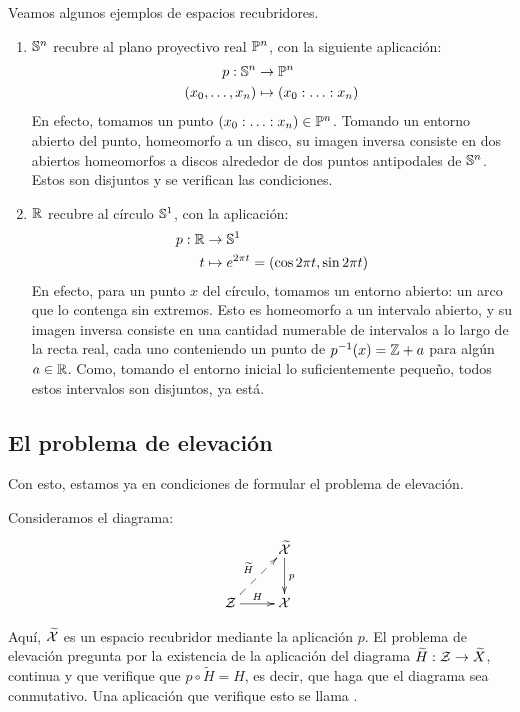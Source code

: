 \begin{exa}[Recubrimientos]
	\label{grf_exa_recubrimientos}
	Veamos algunos ejemplos de espacios recubridores.
	
	\begin{enumerate}
		\item $\mathbb{S}^n$ recubre al plano proyectivo real $\mathbb{P}^n$, con la siguiente aplicación:
		\[\begin{split}
		p:\mathbb{S}^n&\to\mathbb{P}^n \\
		(x_0,\dots,x_n)&\mapsto (x_0:\dotsc:x_n)
		\end{split}\]
		En efecto, tomamos un punto $(x_0:\dotsc:x_n)\in\mathbb{P}^n$. Tomando un entorno abierto del punto, homeomorfo a un disco, su imagen inversa consiste en dos abiertos homeomorfos a discos alrededor de dos puntos antipodales de $\mathbb{S}^n$. Estos son disjuntos y se verifican las condiciones.
		
		\item $\mathbb{R}$ recubre al círculo $\mathbb{S}^1$, con la aplicación:
		\[\begin{split}
		p:\mathbb{R}&\to\mathbb{S}^1 \\
		t &\mapsto e^{2\pi t}=(\cos 2\pi t,\sin 2\pi t)
		\end{split}\]
		En efecto, para un punto $x$ del círculo, tomamos un entorno abierto: un arco que lo contenga sin extremos. Esto es homeomorfo a un intervalo abierto, y su imagen inversa consiste en una cantidad numerable de intervalos a lo largo de la recta real, cada uno conteniendo un punto de $p^{-1}(x) = \mathbb{Z} + a$ para algún $a\in\mathbb{R}$. Como, tomando el entorno inicial lo suficientemente pequeño, todos estos intervalos son disjuntos, ya está. \qedhere
	\end{enumerate}
\end{exa}

\subsection{El problema de elevación}

Con esto, estamos ya en condiciones de formular el problema de elevación.

\begin{const}
	Consideramos el diagrama:
	\[\xymatrix{
		& \widetilde{\X} \ar[d]^p \\
		\mc{Z} \ar@{-->}[ru]^{\widetilde{H}} \ar[r]^H & \X
	}\]
	
	Aquí, $\widetilde{\mathcal{X}}$ es un espacio recubridor mediante la aplicación $p$. El problema de elevación pregunta por la existencia de la aplicación del diagrama $\widetilde{H}:\mathcal{Z}\to \widetilde{X}$, continua y que verifique que $p\circ\widetilde{H}=H$, es decir, que haga que el diagrama sea conmutativo. Una aplicación que verifique esto se llama .
\end{const}

